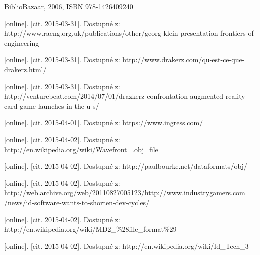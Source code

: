 \documentclass[twoside,12pt]{article}
\begin{document}
% 
% 
\begin{literatura}


 {
	BiblioBazaar, 2006, ISBN 978-1426409240
}

{
	 [online]. [cit. 2015-03-31]. Dostupné z: 		http://www.raeng.org.uk/publications/other/georg-klein-presentation-frontiers-of-engineering
}

{
	 [online]. [cit. 2015-03-31]. Dostupné z: http://www.drakerz.com/qu-est-ce-que-drakerz.html/
}

{
	 [online]. [cit. 2015-03-31]. Dostupné z: http://venturebeat.com/2014/07/01/drazkerz-confrontation-augmented-reality-card-game-launches-in-the-u-s/
}

{
	 [online]. [cit. 2015-04-01]. Dostupné z: https://www.ingress.com/
}

{
	 [online]. [cit. 2015-04-02]. Dostupné z: http://en.wikipedia.org/wiki/Wavefront\_.obj\_file
}

{
	 [online]. [cit. 2015-04-02]. Dostupné z: http://paulbourke.net/dataformats/obj/
}

{
	 [online]. [cit. 2015-04-02]. Dostupné z: http://web.archive.org/web/20110827005123/http://www.industrygamers.com /news/id-software-wants-to-shorten-dev-cycles/
}

{
	 [online]. [cit. 2015-04-02]. Dostupné z: http://en.wikipedia.org/wiki/MD2\_\%28file\_format\%29
}

{
	 [online]. [cit. 2015-04-02]. Dostupné z: http://en.wikipedia.org/wiki/Id\_Tech\_3
}


\end{literatura}
\end{document}
